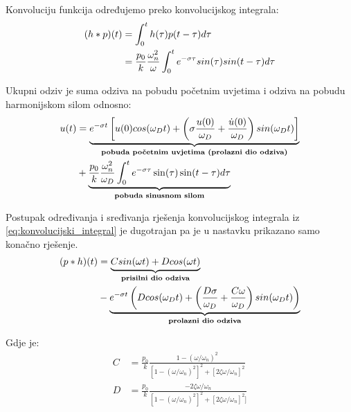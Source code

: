 Konvoluciju funkcija određujemo preko konvolucijskog integrala:
\begin{align}\label{eq:konvolucijski_integral}
	(h*p)(t)&=\int_0^th(\tau)p(t-\tau)d\tau \notag\\
		&=\frac{p_0}{k}\frac{\omega_n^2}{\omega}
		\int_0^te^{-\sigma\tau}sin(\tau)sin(t-\tau)d\tau
\end{align}

Ukupni odziv je suma odziva na pobudu početnim uvjetima i odziva na pobudu
harmonijskom silom odnosno:
\begin{equation}
    \begin{split}
    u(t)&=\underbrace{e^{-\sigma t}\left[
		u(0)cos(\omega_Dt)+\left(
                        \sigma\frac{u(0)}{\omega_D}+\frac{\dot{u}(0)}{\omega_D}
                        \right)sin(\omega_Dt) \right]}_{\text{\textbf{pobuda
                    početnim uvjetima (prolazni dio odziva)}}}\\
                    &+\underbrace{
                        \frac{p_0}{k}
                        \frac{\omega_n^2}{\omega_D}
                        \int_0^te^{-\sigma\tau}\sin(\tau)\sin(t-\tau)d\tau
                    }_{\text{\textbf{pobuda sinusnom silom}}}
    \end{split}
    \label{eq:inverz_drugi_korak}
\end{equation}

Postupak određivanja i sređivanja rješenja konvolucijskog integrala iz
\eqref{eq:konvolucijski_integral} je dugotrajan pa je u nastavku prikazano samo konačno 
rješenje.
\begin{equation}
	\begin{split}
	(p*h)(t)&=\underbrace{
			Csin(\omega t)+Dcos(\omega t)
		}_{\text{\textbf{prisilni dio odziva}}}\\
		&-
		\underbrace{
			e^{-\sigma t}
				\left(
				Dcos(\omega_D t) +
					\left(
						\frac{D\sigma}{\omega_D}+\frac{C\omega}{\omega_D}
					\right)
				sin(\omega_Dt)
				\right)
		}_{\text{\textbf{prolazni dio odziva}}}
	\end{split}
    \label{eq:konvolucijski_integral_rjesenje}
\end{equation}

Gdje je:
\begin{align}
    C &= \frac{p_0}{k}\frac{1-(\omega/\omega_n)^2}
            {[1-(\omega/\omega_n)^2]^2+[2\zeta\omega/\omega_n]^2}\label{eq:koef_C}\\
    D &= \frac{p_0}{k}\frac{-2\zeta\omega/\omega_n}
            {[1-(\omega/\omega_n)^2]^2+[2\zeta\omega/\omega_n]^2]}\label{eq:koef_D}
\end{align}

